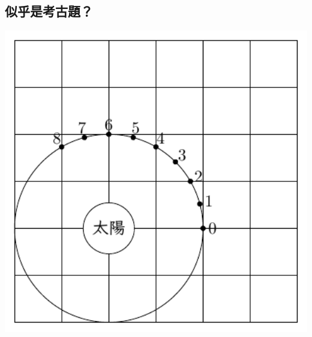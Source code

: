 \documentclass[12pt]{article}
\begin{document}
\subsection{似乎是考古題？}

\begin{center} \includegraphics*[width=15cm]{b.pdf} \end{center}
\end{document}
